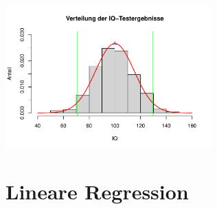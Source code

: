 \documentclass[12pt,a4paper]{article}
\begin{document}
\begin{center}\includegraphics[width=300px]{solution_3_files/figure-latex/unnamed-chunk-15-1} \end{center}

\hypertarget{lineare-regression}{%
\section{Lineare Regression}\label{lineare-regression}}
\end{document}
